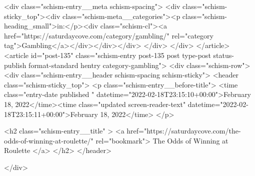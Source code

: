 {		<div class="schism-entry__meta schism-spacing">			<div class="schism-sticky_top"><div class="schism-meta__categories"><p class="schism-heading_small">in:</p><div class="schism-cl"><a href="https://saturdaycove.com/category/gambling/" rel="category tag">Gambling</a></div></div></div>		</div>
	</div>
</article>
<article id="post-135" class="schism-entry post-135 post type-post status-publish format-standard hentry category-gambling">
	<div class="schism-row">		<div class="schism-entry__header schism-spacing schism-sticky">			<header class="schism-sticky_top">				<p class="schism-entry__before-title">
					<time class="entry-date published " datetime="2022-02-18T23:15:10+00:00">February 18, 2022</time><time class="updated screen-reader-text" datetime="2022-02-18T23:15:11+00:00">February 18, 2022</time>				</p>

				<h2 class="schism-entry__title" >
					<a href="https://saturdaycove.com/the-odds-of-winning-at-roulette/" rel="bookmark">
						The Odds of Winning at Roulette					</a>
				</h2>
			</header>

					</div>

}
